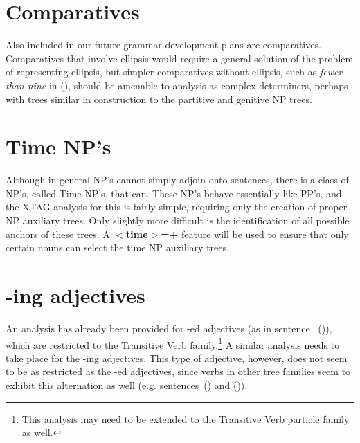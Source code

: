 \section{Comparatives}

Also included in our future grammar development plans are comparatives.
Comparatives that involve ellipsis would require a general solution of the
problem of representing ellipsis, but simpler comparatives without ellipsis,
such as {\it fewer than nine\/} in (), should be amenable to analysis as
complex determiners, perhaps with trees similar in construction to the
partitive and genitive NP trees.




\section{Time NP's}

Although in general NP's cannot simply adjoin onto sentences, there is a class
of NP's, called Time NP's, that can.  These NP's behave essentially like PP's,
and the XTAG analysis for this is fairly simple, requiring only the creation of
proper NP auxiliary trees.  Only slightly more difficult is the identification
of all possible anchors of these trees.  A {\bf $<$time$>$=+} feature will be
used to ensure that only certain nouns can select the time NP auxiliary trees.




\section{-ing adjectives}

An analysis has already been provided for -ed adjectives (as in sentence~
()), which are restricted to the Transitive Verb family.\footnote{This
analysis may need to be extended to the Transitive Verb particle family as
well.}  A similar analysis needs to take place for the -ing adjectives.  This
type of adjective, however, does not seem to be as restricted as the -ed
adjectives, since verbs in other tree families seem to exhibit this alternation
as well (e.g. sentences~() and ()).




